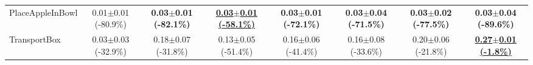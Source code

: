 \begin{table}[htbp]
\begin{adjustbox}{max width=\textwidth}
\begin{tabular}{l*{7}{c}}
PlaceAppleInBowl & 0.01$\pm$0.01 \scriptsize{(-80.9\%)} & \textbf{0.03$\pm$0.01 \scriptsize{(-82.1\%)}} & \textbf{\underline{0.03$\pm$0.01 \scriptsize{(-58.1\%)}}} & \textbf{0.03$\pm$0.01 \scriptsize{(-72.1\%)}} & \textbf{0.03$\pm$0.04 \scriptsize{(-71.5\%)}} & \textbf{0.03$\pm$0.02 \scriptsize{(-77.5\%)}} & \textbf{0.03$\pm$0.04 \scriptsize{(-89.6\%)}} \\
TransportBox & 0.03$\pm$0.03 \scriptsize{(-32.9\%)} & 0.18$\pm$0.07 \scriptsize{(-31.8\%)} & 0.13$\pm$0.05 \scriptsize{(-51.4\%)} & 0.16$\pm$0.06 \scriptsize{(-41.4\%)} & 0.16$\pm$0.08 \scriptsize{(-33.6\%)} & 0.20$\pm$0.06 \scriptsize{(-21.8\%)} & \textbf{\underline{0.27$\pm$0.01 \scriptsize{(-1.8\%)}}} \\
\bottomrule
\end{tabular}
\end{adjustbox}
\end{table}

